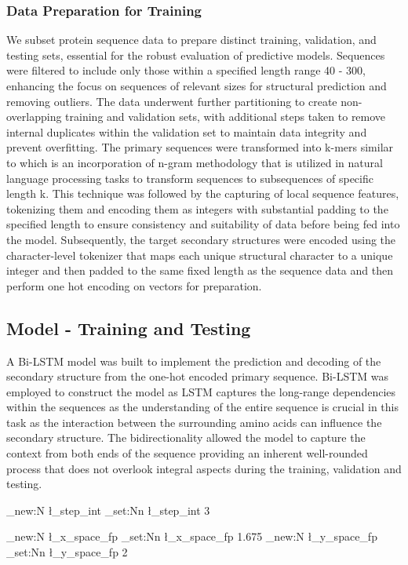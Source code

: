 \documentclass[conference]{IEEEtran}
\begin{document}
\subsubsection{Data Preparation for Training}
We subset protein sequence data to prepare distinct training, validation, and testing sets, essential for the robust evaluation of predictive models. Sequences were filtered to include only those within a specified length range 40 - 300, enhancing the focus on sequences of relevant sizes for structural prediction and removing outliers. The data underwent further partitioning to create non-overlapping training and validation sets, with additional steps taken to remove internal duplicates within the validation set to maintain data integrity and prevent overfitting.
The primary sequences were transformed into k-mers similar to \cite{kmer} which is an incorporation of n-gram methodology that is utilized in natural language processing tasks to transform sequences to subsequences of specific length k. This technique was followed by the capturing of local sequence features, tokenizing them and encoding them as integers with substantial padding to the specified length to ensure consistency and suitability of data before being fed into the model. Subsequently, the target secondary structures were encoded using the character-level tokenizer that maps each unique structural character to a unique integer and then padded to the same fixed length as the sequence data and then perform one hot encoding on vectors for preparation.
\subsection{Model - Training and Testing}
A Bi-LSTM model was built to implement the prediction and decoding of the secondary structure from the one-hot encoded primary sequence. Bi-LSTM was employed to construct the model as LSTM captures the long-range dependencies within the sequences as the understanding of the entire sequence is crucial in this task as the interaction between the surrounding amino acids can influence the secondary structure. The bidirectionality allowed the model to capture the context from both ends of the sequence providing an inherent well-rounded process that does not overlook integral aspects during the training, validation and testing. 
\ExplSyntaxOn

\int_new:N \l_step_int
\int_set:Nn \l_step_int {3}

\fp_new:N \l_x_space_fp
\fp_set:Nn \l_x_space_fp {1.675}
\fp_new:N \l_y_space_fp
\fp_set:Nn \l_y_space_fp {2}
\end{document}
